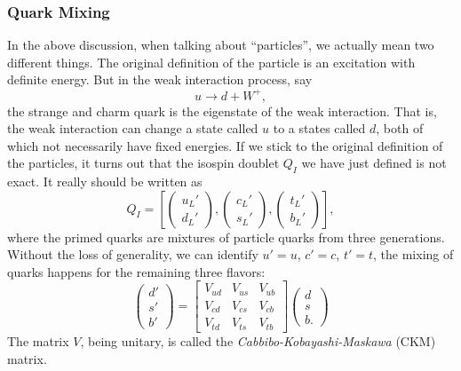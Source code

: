 \subsubsection{Quark Mixing}
In the above discussion, when talking about ``particles'', we actually mean two different things. 
The original definition of the particle is an excitation with definite energy.
But in the weak interaction process, say
\begin{equation}
	u \rightarrow d + W^+,
\end{equation}
the strange and charm quark is the eigenstate of the weak interaction.
That is, the weak interaction can change a state called $u$ to a states called $d$, both of which not necessarily have fixed energies.
If we stick to the original definition of the particles, it turns out that the isospin doublet $Q_I$ we have just defined is not exact.
It really should be written as
\begin{equation}
	Q_I = \left[
		\begin{pmatrix} u_L' \\ d_L' \end{pmatrix},
		\begin{pmatrix} c_L' \\ s_L' \end{pmatrix},
		\begin{pmatrix} t_L' \\ b_L' \end{pmatrix}
	\right],
\end{equation}
where the primed quarks are mixtures of particle quarks from three generations.
Without the loss of generality, we can identify $u'=u$, $c'=c$, $t'=t$, the mixing of quarks happens for the remaining three flavors:
\begin{equation}
	\begin{pmatrix}
		d' \\ s' \\ b'
	\end{pmatrix}
	= \begin{bmatrix}
		V_{ud} & V_{us} & V_{ub} \\
		V_{cd} & V_{cs} & V_{cb} \\
		V_{td} & V_{ts} & V_{tb}
	\end{bmatrix}
	\begin{pmatrix}
		d \\ s \\ b.
	\end{pmatrix}
\end{equation}
The matrix $V$, being unitary, is called the \textit{Cabbibo-Kobayashi-Maskawa} (CKM) matrix.
